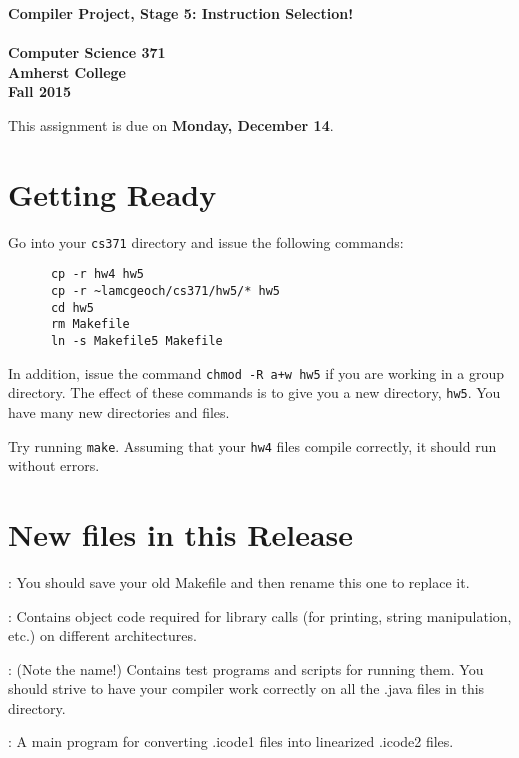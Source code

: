 \documentclass[11pt]{article}
\begin{document}
\begin{center}
\Large \bf Compiler Project, Stage 5: Instruction Selection!\\ \mbox{} \\
\large Computer Science 371 \\
\large Amherst College \\
\large Fall 2015
\end{center}

This assignment is due on {\bf Monday, December 14}.

\section{Getting Ready}

Go into your \verb'cs371' directory and issue the following commands:
\begin{verbatim}
      cp -r hw4 hw5          
      cp -r ~lamcgeoch/cs371/hw5/* hw5
      cd hw5
      rm Makefile
      ln -s Makefile5 Makefile
\end{verbatim}
In addition, issue the command \verb'chmod -R a+w hw5' if you are working in a group directory.
The effect of these commands is to give you a new directory, \verb'hw5'.  You have many new directories and files.

Try running \verb'make'.  Assuming that your \verb'hw4' files compile correctly, it should run without errors.

\section{New files in this Release}

\mbox{}\par{}: You should save your old Makefile and then rename this one to replace it.

\mbox{}\par{}:  Contains object code required for library calls (for printing, string manipulation, etc.) on different architectures.

\mbox{}\par{}:  (Note the name!)  Contains test programs and scripts for running them.  You should strive to have your compiler work correctly on all the .java files in this directory. 

\mbox{}\par{}:  A main program for converting .icode1 files into linearized .icode2 files.
\end{document}
